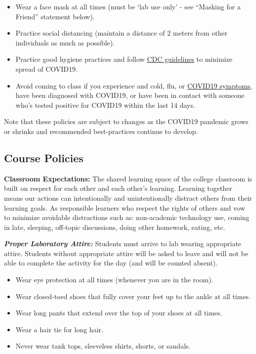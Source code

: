 \documentclass[]{tufte-book}
\providecommand{\tightlist}{%
  \setlength{\itemsep}{0pt}\setlength{\parskip}{0pt}}
\begin{document}
\begin{itemize}
\tightlist
\item
  Wear a face mask at all times (must be `lab use only' - see ``Masking for a Friend'' statement below).
\item
  Practice social distancing (maintain a distance of 2 meters from other individuals as much as possible).
\item
  Practice good hygiene practices and follow \href{https://www.cdc.gov/coronavirus/2019-ncov/prevent-getting-sick/prevention.html}{CDC guidelines} to minimize spread of COVID19.
\item
  Avoid coming to class if you experience and cold, flu, or \href{https://www.cdc.gov/coronavirus/2019-ncov/symptoms-testing/symptoms.html}{COVID19 symptoms}, have been diagnosed with COVID19, or have been in contact with someone who's tested positive for COVID19 within the last 14 days.
\end{itemize}

Note that these policies are subject to changes as the COVID19 pandemic grows or shrinks and recommended best-practices continue to develop.

\hypertarget{course-policies}{%
\subsection*{Course Policies}\label{course-policies}}

\textbf{Classroom Expectations:} The shared learning space of the college classroom is built on respect for each other and each other's learning. Learning together means our actions can intentionally and unintentionally distract others from their learning goals. As responsible learners who respect the rights of others and vow to minimize avoidable distractions such as: non-academic technology use, coming in late, sleeping, off-topic discussions, doing other homework, eating, etc.

\textbf{\emph{Proper Laboratory Attire:}} Students must arrive to lab wearing appropriate attire. Students without appropriate attire will be asked to leave and will not be able to complete the activity for the day (and will be counted absent).

\begin{itemize}
\tightlist
\item
  Wear eye protection at all times (whenever you are in the room).\\
\item
  Wear closed-toed shoes that fully cover your feet up to the ankle at all times.\\
\item
  Wear long pants that extend over the top of your shoes at all times.\\
\item
  Wear a hair tie for long hair.\\
\item
  Never wear tank tops, sleeveless shirts, shorts, or sandals.
\end{itemize}
\end{document}
